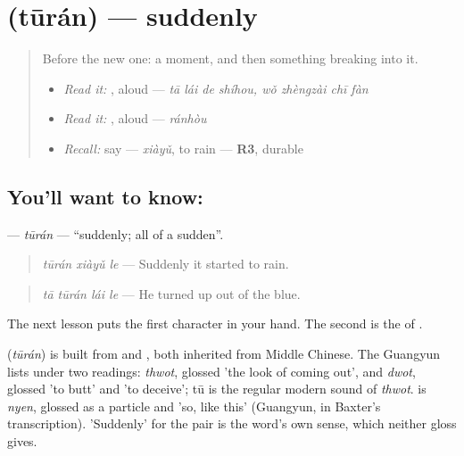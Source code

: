 \section[\texorpdfstring{\zh{突然} (tūrán)}{突然 (tūrán)}]{ (tūrán) — suddenly}

\label{lesson:ZH-C279-turan}



\begin{quote}
Before the new one: a moment, and then something breaking into it.

\begin{itemize}
\raggedright
  \item \emph{Read it:}  , aloud — \emph{tā lái de shíhou, wǒ zhèngzài chī fàn}
  \item \emph{Read it:} , aloud — \emph{ránhòu}
  \item \emph{Recall:} say  — \emph{xiàyǔ}, to rain — \textbf{R3}, durable
\end{itemize}
\end{quote}

\subsection*{You'll want to know: }
\textbf{} — \emph{tūrán} — \textquotedblleft{}suddenly; all of a sudden\textquotedblright{}.

\begin{quote}
\textbf{} \emph{tūrán xiàyǔ le} — Suddenly it started to rain.
\end{quote}

\begin{quote}
\textbf{} \emph{tā tūrán lái le} — He turned up out of the blue.
\end{quote}

The next lesson puts the first character in your hand. The second is the  of .

\begin{cousinweb}
\textbf{} (\emph{tūrán}) is built from  and , both inherited from Middle Chinese. The Guangyun lists  under two readings: \emph{thwot}, glossed 'the look of coming out', and \emph{dwot}, glossed 'to butt' and 'to deceive'; tū is the regular modern sound of \emph{thwot}.  is \emph{nyen}, glossed as a particle and 'so, like this' (Guangyun, in Baxter's transcription). 'Suddenly' for the pair is the word's own sense, which neither gloss gives.
\end{cousinweb}

